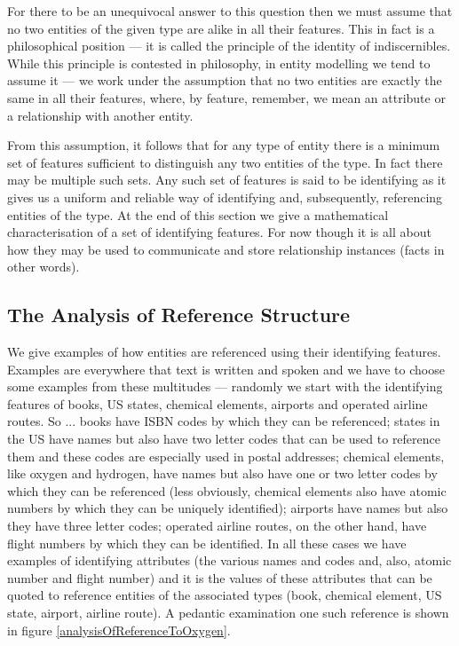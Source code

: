 For there to be an unequivocal answer to this question then we must assume that no two entities of the given type are alike in all their features. This in fact  is a philosophical position 
--- it is called the principle of the identity of indiscernibles. 
While this principle is contested in philosophy, in entity modelling we tend to assume it --- we work under the assumption that no two entities are exactly the same in all their features, where, by feature, remember, we mean an attribute or a relationship with another entity. 

From this assumption, it follows that for any type of entity there is a minimum set of features sufficient to distinguish any two entities of the type. In fact there may be multiple such sets. 
Any such set of features is said to be identifying as it gives us 
a uniform and reliable way of identifying and, subsequently, referencing entities of the type. At the end of this section we give a mathematical characterisation of a set of identifying features. For now though it is all about how they may be used to communicate and store relationship instances (facts in  other words).
\subsection{The Analysis of Reference Structure}
\mynote
We give examples of how entities are referenced using their identifying features. Examples are everywhere that text is written and spoken and we have to choose some examples from these multitudes
--- randomly we start with the identifying features of books, US states, chemical elements, airports and operated airline routes. 
So ... books have ISBN codes by which they can be referenced; 
states in the US have names but also have two letter codes that can be used to reference them and these codes are especially used in postal addresses; chemical elements, like oxygen and hydrogen, have names but also have one or two letter codes by which they can be referenced
(less obviously, chemical elements also have atomic numbers by which they can be uniquely identified); airports have names but also they have three letter codes; operated airline routes, on the other hand, 
have flight numbers by which they can be identified.
In all these cases we have examples of identifying attributes (the various names and codes and, also, atomic number and flight number) 
and it is the values of these attributes that can be quoted to reference entities of the associated types
(book, chemical element, US state, airport, airline route). A pedantic examination one such reference is shown in figure \ref{analysisOfReferenceToOxygen}.


